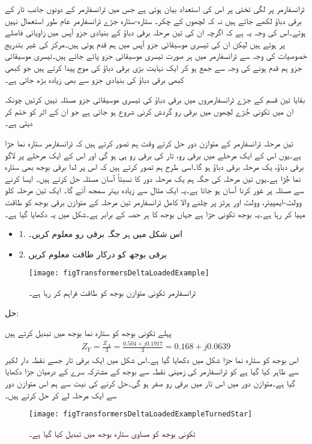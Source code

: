	ٹرانسفارمر پر لگی تختی پر اس کی استعداد بیان ہوتی ہے جس میں ٹرانسفارمر کے دونوں جانب تار کے برقی دباؤ لکھے جاتے ہیں نہ کہ لچھوں کے چکر۔
%
ستارہ-ستارہ جڑے ٹرانسفارمر عام طور استعمال نہیں ہوتے۔اس کی وجہ یہ ہے کہ اگرچہ ان کی تین مرحلہ برقی دباؤ  کے بنیادی جزو آپس میں   زاویائی فاصلے پر ہوتے ہیں لیکن ان کی تیسری موسیقائی جزو آپس میں ہم قدم ہوتی ہیں۔مرکز کی غیر بتدریج خصوصیات کی وجہ سے ٹرانسفارمر میں ہر صورت تیسری موسیقائی جزو پائے جاتے ہیں۔تیسری موسیقائی جزو ہم قدم ہونے کی وجہ سے جمع ہو کر ایک نہایت بڑی برقی دباؤ کی موج پیدا کرتے ہیں جو کبھی کبھی برقی دباؤ کی بنیادی جزو سے بھی زیادہ بڑھ جاتی ہے۔

بقایا تین قسم کے جڑے ٹرانسفارمروں میں برقی دباؤ کی تیسری موسیقائی جزو مسئلہ نہیں کرتیں چونکہ ان میں تکونی جُڑے لچھوں میں برقی رو گردش کرنی شروع ہو جاتی ہے جو ان کے اثر کو ختم کر دیتی ہے۔

تین مرحلہ ٹرانسفارمر کے متوازن دور حل کرتے وقت ہم تصور کرتے ہیں کہ ٹرانسفارمر ستارہ نما جڑا  ہے۔یوں اس کے ایک مرحلے میں برقی رو، تار  کی برقی رو ہی ہو گی اور اس کے ایک مرحلے پر لاگو برقی دباؤ، یک مرحلہ برقی دباؤ  ہو گا۔اسی طرح ہم تصور کرتے ہیں کہ اس پر لدا برقی بوجھ بھی ستارہ نما جُڑا ہے۔یوں تین مرحلہ کی جگہ ہم یک مرحلہ دور کا نسبتاً آسان مسئلہ حل کرتے ہیں۔ ایسا کرنے سے مسئلہ پر غور کرنا آسان ہو جاتا ہے۔یہ ایک مثال سے زیادہ بہتر سمجھ آئے گا۔
%
ایک تین مرحلہ     کلو وولٹ-ایمپیئر،    وولٹ اور  ہرٹز پر چلنے والا کامل ٹرانسفارمر تین مرحلہ کے متوازن برقی بوجھ کو طاقت مہیا کر رہا ہے۔یہ بوجھ تکونی جڑا ہے جہاں بوجھ کا ہر حصہ  کے برابر ہے۔شکل   میں یہ دکھایا گیا ہے۔
\begin{itemize}
\item
1. اس شکل میں ہر جگہ برقی رو معلوم کریں۔
\item
2. برقی بوجھ کو درکار طاقت معلوم کریں
\end{itemize}

\begin{figure}
\centering
\texttt{[image: figTransformersDeltaLoadedExample]}
\caption{ٹرانسفارمر تکونی متوازن بوجھ کو طاقت فراہم کر رہا ہے۔}
\label{شکل_ٹرانسفارمر_تکونی_بار_کی_مثال}
\end{figure}
حل:

پہلے تکونی بوجھ کو ستارہ نما بوجھ میں تبدیل کرتے ہیں
\begin{align*}
Z_Y= \frac{Z_\Delta}{3}=\frac{0.504+j0.1917}{3}=0.168+j0.0639
\end{align*}
اس بوجھ کو ستارہ نما جڑا شکل  میں دکھایا گیا ہے۔اس شکل میں ایک برقی تار جسے نقطہ دار لکیر سے ظاہر کیا گیا ہے کو ٹرانسفارمر کی زمینی نقطہ سے بوجھ کے مشترکہ سرے کے درمیان جڑا دکھایا گیا ہے۔متوازن دور میں اس تار میں برقی رو صفر ہو گی۔حل کرنے کی نیت سے ہم اس متوازن دور سے ایک مرحلہ لے کر حل کرتے ہیں۔
\begin{figure}
\centering
\texttt{[image: figTransformersDeltaLoadedExampleTurnedStar]}
\caption{تکونی بوجھ کو مساوی ستارہ بوجھ میں تبدیل کیا گیا ہے۔}
\label{شکل_ٹرانسفارمر_تکونی_بار_کو_ستارہ_تبادلہ}
\end{figure}

